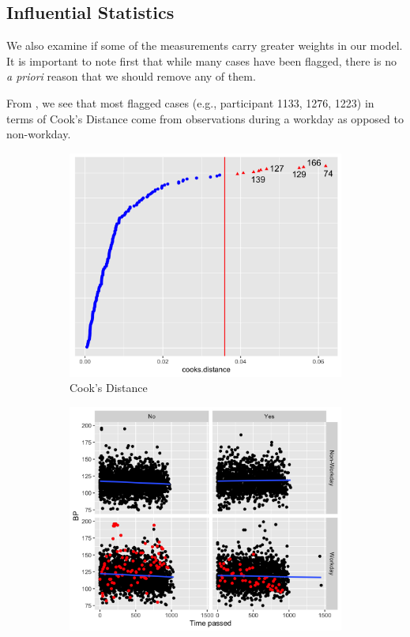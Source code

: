 \documentclass[12pt,twoside,letterpaper]{article}
\theoremstyle{definition}
\theoremstyle{definition}
\begin{document}
\subsection{Influential Statistics}\label{sec: infl stat}

We also examine if some of the measurements carry greater weights in our model. It is important to note first that while many cases have been flagged, there is no \emph{a priori} reason that we should remove any of them.

From , we see that most flagged cases (e.g., participant 1133, 1276, 1223) in terms of Cook's Distance come from observations during a workday as opposed to non-workday. 
\begin{figure}[H] 
    \centering
    \begin{subfigure}[b]{0.38\textwidth}
    \centering
    \includegraphics[width=\textwidth]{pics/cook dist.png}
    \caption[]%
    {{\small Cook's Distance}}
    \label{fig: cook dist}
    \end{subfigure}
    \begin{subfigure}[b]{0.38\textwidth}
    \centering
    \includegraphics[width=\textwidth]{pics/cook by time and bp.png}

\end{subfigure}
\end{figure}
\end{document}
